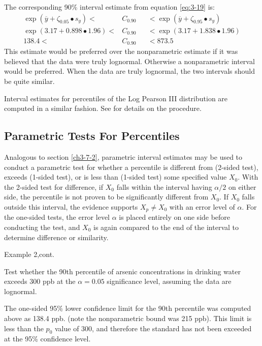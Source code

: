 \documentclass[]{book}
\begin{document}
The corresponding 90\% interval estimate from equation \eqref{eq:3-19} is:
\begin{equation}
\begin{aligned}
\exp{\left( \overline{y} + \zeta_{0.05} \bullet s_{y} \right)} < & C_{0.90} && < \exp{\left( \overline{y} + \zeta_{0.95} \bullet s_{y} \right)} \\
\exp{\left( 3.17 + 0.898 \bullet 1.96 \right)} < & C_{0.90} && < \exp{\left( 3.17 + 1.838 \bullet 1.96 \right)} \\
138.4 < & C_{0.90} && < 873.5
\end{aligned}
\end{equation}
This estimate would be preferred over the nonparametric estimate if it was believed that the data were truly lognormal. Otherwise a nonparametric interval would be preferred. When the data are truly lognormal, the two intervals should be quite similar.

Interval estimates for percentiles of the Log Pearson III distribution are computed in a similar fashion. See \citet{stedinger_confidence_1983} for details on the procedure.

\hypertarget{ch3-7-4}{%
\subsection{Parametric Tests For Percentiles}\label{ch3-7-4}}

Analogous to section \ref{ch3-7-2}, parametric interval estimates may be used to conduct a parametric test for whether a percentile is different from (2-sided test), exceeds (1-sided test), or is less than (1-sided test) some specified value \(X_{0}\). With the 2-sided test for difference, if \(X_{0}\) falls within the interval having \(\alpha / 2\) on either side, the percentile is not proven to be significantly different from \(X_{0}\). If \(X_{0}\) falls outside this interval, the evidence supports \(X_{p} \neq X_{0}\) with an error level of \(\alpha\). For the one-sided tests, the error level \(\alpha\) is placed entirely on one side before conducting the test, and \(X_{0}\) is again compared to the end of the interval to determine difference or similarity.

Example 2,cont.

Test whether the 90th percentile of arsenic concentrations in drinking water exceeds 300 ppb at the \(\alpha = 0.05\) significance level, assuming the data are lognormal.

The one-sided 95\% lower confidence limit for the 90th percentile was computed above as 138.4 ppb. (note the nonparametric bound was 215 ppb). This limit is less than the \(p_{0}\) value of 300, and therefore the standard has not been exceeded at the 95\% confidence level.
\end{document}
